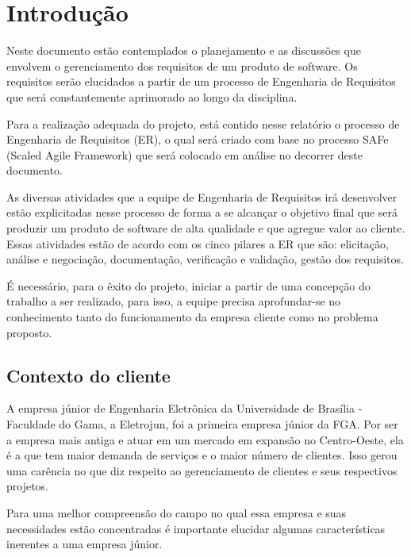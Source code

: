 \chapter[Introdução]{Introdução}

Neste documento estão contemplados o planejamento e as discussões que envolvem o gerenciamento dos requisitos de um produto de software. Os requisitos serão elucidados a partir de um processo de Engenharia de Requisitos que será constantemente aprimorado ao longo da disciplina.

Para a realização adequada do projeto, está contido nesse relatório o processo de Engenharia de Requisitos (ER), o qual será criado com base no processo SAFe (Scaled Agile Framework) que será colocado em análise no decorrer deste documento.

As diversas atividades que a equipe de Engenharia de Requisitos irá desenvolver estão explicitadas nesse processo de forma a se alcançar o objetivo final que será produzir um produto de software de alta qualidade e que agregue valor ao cliente. Essas atividades estão de acordo com os cinco pilares a ER que são: elicitação, análise e negociação, documentação, verificação e validação, gestão dos requisitos.

É necessário, para o êxito do projeto, iniciar a partir de uma concepção do trabalho a ser realizado, para isso, a equipe precisa aprofundar-se no conhecimento tanto do funcionamento da empresa cliente como no problema proposto.

  \section{Contexto do cliente}
A empresa júnior de Engenharia Eletrônica da Universidade de Brasília - Faculdade do Gama, a Eletrojun, foi a primeira empresa júnior da FGA. Por ser a empresa mais antiga e atuar em um mercado em expansão no Centro-Oeste, ela é a que tem maior demanda de serviços e o maior número de clientes. Isso gerou uma carência no que diz respeito ao gerenciamento de clientes e seus respectivos projetos.

Para uma melhor compreensão do campo no qual essa empresa e suas necessidades estão concentradas é importante elucidar algumas características inerentes a uma empresa júnior.

